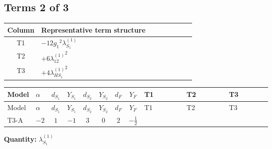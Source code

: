 \documentclass[8pt]{article}
\begin{document}
\begin{landscape}
\subsection*{Terms 2 of 3}
\begin{center}
\begin{tabular}{@{}c >{\raggedright\arraybackslash}p{0.82\linewidth}@{}}
\toprule
Column & Representative term structure \\
\midrule
T1 & \(\displaystyle -12 {g_1}^2 {\lambda_{S_1}^{(1)}}\) \\
\midrule
T2 & \(\displaystyle +6 {\lambda_{12}^{(1)}}^2\) \\
\midrule
T3 & \(\displaystyle +4 {\lambda_{HS_1}^{(1)}}^2\) \\
\midrule
\bottomrule
\end{tabular}
\end{center}
\smallskip
\tiny
\begin{longtable}{@{}llcccccc >{\raggedright\arraybackslash}p{0.21\linewidth} >{\raggedright\arraybackslash}p{0.21\linewidth} >{\raggedright\arraybackslash}p{0.21\linewidth}@{}}
\toprule
Model & $\alpha$ & $d_{S_1}$ & $Y_{S_1}$ & $d_{S_2}$ & $Y_{S_2}$ & $d_F$ & $Y_F$ & T1 & T2 & T3 \\
\midrule
\endfirsthead
\toprule
Model & $\alpha$ & $d_{S_1}$ & $Y_{S_1}$ & $d_{S_2}$ & $Y_{S_2}$ & $d_F$ & $Y_F$ & T1 & T2 & T3 \\
\midrule
\endhead
T3-A & $-2$ & $1$ & $-1$ & $3$ & $0$ & $2$ & $-\frac{1}{2}$ & \scriptsize\adjustbox{max width=\linewidth}{$\begin{gathered} -12 {g_1}^2 {\lambda_{S_1}^{(1)}}\end{gathered}$} & \scriptsize\adjustbox{max width=\linewidth}{$\begin{gathered} +6 {\lambda_{12}^{(1)}}^2\end{gathered}$} & \scriptsize\adjustbox{max width=\linewidth}{$\begin{gathered} +4 {\lambda_{HS_1}^{(1)}}^2\end{gathered}$} \\
\midrule
\bottomrule
\end{longtable}
\clearpage
\noindent\textbf{Quantity: }$\lambda_{S_1}^{(1)}$\par\smallskip

\end{landscape}
\end{document}
